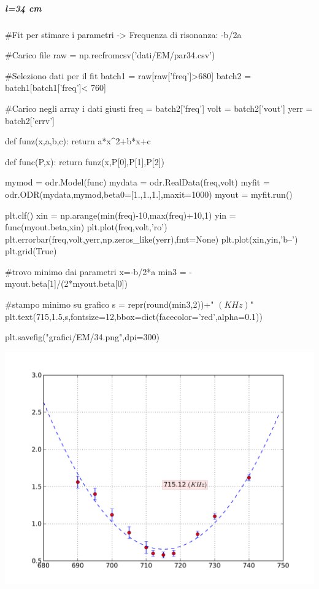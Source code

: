 \subparagraph*{l=34 cm}

\begin{sagesilent}
 #Fit per stimare i parametri -> Frequenza di risonanza: -b/2a

#Carico file
raw = np.recfromcsv('dati/EM/par34.csv')

#Seleziono dati per il fit
batch1 = raw[raw['freq']>680]
batch2 = batch1[batch1['freq']< 760]

#Carico negli array i dati giusti
freq = batch2['freq']
volt = batch2['vout']
yerr = batch2['errv']


def funz(x,a,b,c):
    return a*x^2+b*x+c

def func(P,x):
    return funz(x,P[0],P[1],P[2])

mymod = odr.Model(func)
mydata = odr.RealData(freq,volt)
myfit = odr.ODR(mydata,mymod,beta0=[1.,1.,1.],maxit=1000)
myout = myfit.run()

plt.clf()
xin = np.arange(min(freq)-10,max(freq)+10,1)
yin = func(myout.beta,xin)
plt.plot(freq,volt,'ro')
plt.errorbar(freq,volt,yerr,np.zeros_like(yerr),fmt=None)
plt.plot(xin,yin,'b--')
plt.grid(True)

#trovo minimo dai parametri x=-b/2*a
min3 = -myout.beta[1]/(2*myout.beta[0])


#stampo minimo su grafico
s = repr(round(min3,2))+" $(KHz)$"
plt.text(715,1.5,s,fontsize=12,bbox=dict(facecolor='red',alpha=0.1))

plt.savefig("grafici/EM/34.png",dpi=300)
\end{sagesilent}

\includegraphics[scale=0.75]{grafici/EM/34.png}

